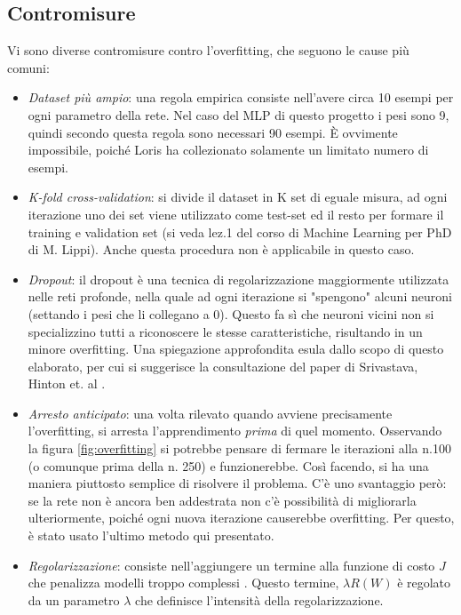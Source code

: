 \subsection{Contromisure}
Vi sono diverse contromisure contro l'overfitting, che seguono le cause più comuni: 
\begin{itemize}
\item \emph{Dataset più ampio}: una regola empirica consiste nell'avere circa 10 esempi per ogni parametro della rete. Nel caso del MLP di questo progetto i pesi sono 9, quindi secondo questa regola sono necessari 90 esempi. È ovvimente impossibile, poiché Loris ha collezionato solamente un limitato numero di esempi. 
\item \emph{K-fold cross-validation}: si divide il dataset in K set di eguale misura, ad ogni iterazione uno dei set viene utilizzato come test-set ed il resto per formare il training e validation set (si veda lez.1 del corso di Machine Learning per PhD di M. Lippi). Anche questa procedura non è applicabile in questo caso. 
\item \emph{Dropout}: il dropout è una tecnica di regolarizzazione maggiormente utilizzata nelle reti profonde, nella quale ad ogni iterazione si "spengono" alcuni neuroni (settando i pesi che li collegano a 0). Questo fa sì che neuroni vicini non si specializzino tutti a riconoscere le stesse caratteristiche, risultando in un minore overfitting. Una spiegazione approfondita esula dallo scopo di questo elaborato, per cui si suggerisce la consultazione del paper di Srivastava, Hinton et. al \parencite{Dropout}.  
\item \emph{Arresto anticipato}: una volta rilevato quando avviene precisamente l'overfitting, si arresta l'apprendimento \emph{prima} di quel momento. Osservando la figura \ref{fig:overfitting} si potrebbe pensare di fermare le iterazioni alla n.100 (o comunque prima della n. 250) e funzionerebbe. Così facendo, si ha una maniera piuttosto semplice di risolvere il problema. C'è uno svantaggio però: se la rete non è ancora ben addestrata non c'è possibilità di migliorarla ulteriormente, poiché ogni nuova iterazione causerebbe overfitting. Per questo, è stato usato l'ultimo metodo qui presentato. 
\item \emph{Regolarizzazione}: consiste nell'aggiungere un termine alla funzione di costo $J$ che penalizza modelli troppo complessi \parencite{WLippi}. Questo termine, $\lambda R(W)$ è regolato da un parametro $\lambda$ che definisce l'intensità della regolarizzazione. 
\end{itemize}\\
